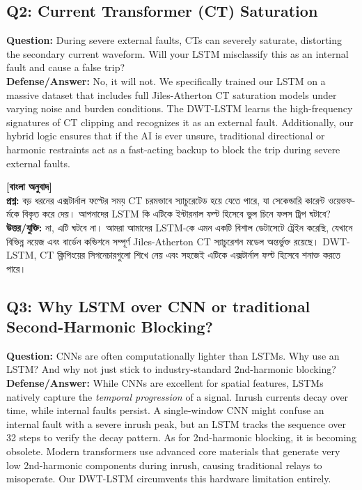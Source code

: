 \documentclass[12pt]{article}
\begin{document}
\subsection*{Q2: Current Transformer (CT) Saturation}
\textbf{Question:} During severe external faults, CTs can severely saturate, distorting the secondary current waveform. Will your LSTM misclassify this as an internal fault and cause a false trip? \\
\textbf{Defense/Answer:} No, it will not. We specifically trained our LSTM on a massive dataset that includes full Jiles-Atherton CT saturation models under varying noise and burden conditions. The DWT-LSTM learns the high-frequency signatures of CT clipping and recognizes it as an external fault. Additionally, our hybrid logic ensures that if the AI is ever unsure, traditional directional or harmonic restraints act as a fast-acting backup to block the trip during severe external faults.

\begin{bengali}
\textbf{[বাংলা অনুবাদ]} \\
\textbf{প্রশ্ন:} বড় ধরনের এক্সটার্নাল ফল্টের সময় CT চরমভাবে স্যাচুরেটেড হয়ে যেতে পারে, যা সেকেন্ডারি কারেন্ট ওয়েভফর্মকে বিকৃত করে দেয়। আপনাদের LSTM কি এটিকে ইন্টারনাল ফল্ট হিসেবে ভুল চিনে ফলস ট্রিপ ঘটাবে? \\
\textbf{উত্তর/যুক্তি:} না, এটি ঘটবে না। আমরা আমাদের LSTM-কে এমন একটি বিশাল ডেটাসেটে ট্রেইন করেছি, যেখানে বিভিন্ন নয়েজ এবং বার্ডেন কন্ডিশনে সম্পূর্ণ Jiles-Atherton CT স্যাচুরেশন মডেল অন্তর্ভুক্ত রয়েছে। DWT-LSTM, CT ক্লিপিংয়ের সিগনেচারগুলো শিখে নেয় এবং সহজেই এটিকে এক্সটার্নাল ফল্ট হিসেবে শনাক্ত করতে পারে।
\end{bengali}

\subsection*{Q3: Why LSTM over CNN or traditional Second-Harmonic Blocking?}
\textbf{Question:} CNNs are often computationally lighter than LSTMs. Why use an LSTM? And why not just stick to industry-standard 2nd-harmonic blocking? \\
\textbf{Defense/Answer:} While CNNs are excellent for spatial features, LSTMs natively capture the \textit{temporal progression} of a signal. Inrush currents decay over time, while internal faults persist. A single-window CNN might confuse an internal fault with a severe inrush peak, but an LSTM tracks the sequence over 32 steps to verify the decay pattern. As for 2nd-harmonic blocking, it is becoming obsolete. Modern transformers use advanced core materials that generate very low 2nd-harmonic components during inrush, causing traditional relays to misoperate. Our DWT-LSTM circumvents this hardware limitation entirely.
\end{document}

